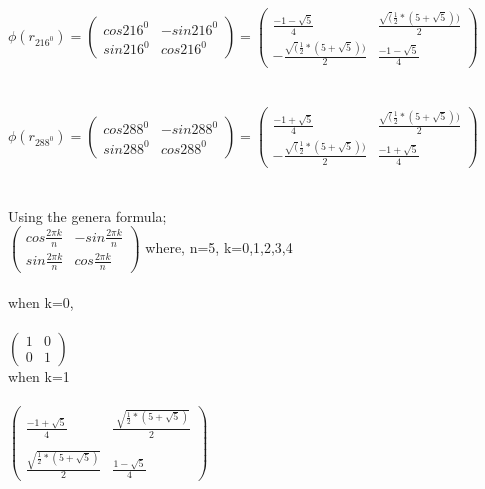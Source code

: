 \documentclass{article}
\begin{document}
\\
$\phi (r_{216^0}) = 
\begin{pmatrix}
cos 216^0 & -sin 216^0\\
sin 216^0 & cos216^0
\end{pmatrix} =
\begin{pmatrix}
\frac{-1-\sqrt{5}}{4} & \frac{\sqrt(\frac{1}{2}*(5+\sqrt{5}))}{2}\\
-\frac{\sqrt(\frac{1}{2}*(5+\sqrt{5}))}{2}& \frac{-1-\sqrt{5}}{4}
\end{pmatrix} $\\\\

\\
$\phi (r_{288^0}) = 
\begin{pmatrix}
cos 288^0 & -sin 288^0\\
sin 288^0 & cos288^0
\end{pmatrix} =
\begin{pmatrix}
\frac{-1+\sqrt{5}}{4} & \frac{\sqrt(\frac{1}{2}*(5+\sqrt{5}))}{2}\\
-\frac{\sqrt(\frac{1}{2}*(5+\sqrt{5}))}{2}& \frac{-1+\sqrt{5}}{4}
\end{pmatrix} $\\\\



\\
Using the genera formula;\\

$\begin{pmatrix}
cos \frac{2 \pi k}{n} & -sin \frac{2 \pi k}{n}\\
sin \frac{2 \pi k}{n} & cos\frac{2 \pi k}{n}
\end{pmatrix}$
where, n=5, k=0,1,2,3,4\\\\

when k=0,\\\\
$\begin{pmatrix}
1 & 0\\
0 & 1
\end{pmatrix}$\\

when k=1\\\\
$\begin{pmatrix}
\frac{-1+\sqrt{5}}{4} & \frac{\sqrt[]{\frac{1}{2}*(5+\sqrt{5})}}{2}\\\\
\frac{\sqrt{\frac{1}{2}*(5+\sqrt{5})}}{2}& \frac{1-\sqrt{5}}{4}
\end{pmatrix}$ \\
\end{document}
